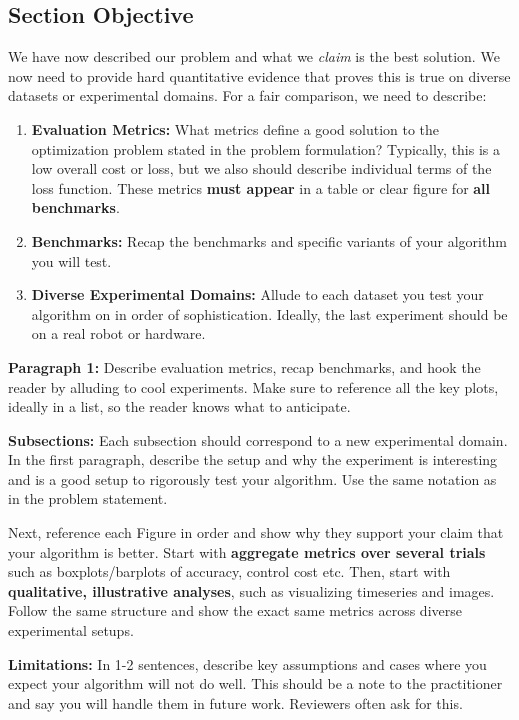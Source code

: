 \subsection{Section Objective}
We have now described our problem and what we \textit{claim} is the best solution.
We now need to provide hard quantitative evidence that proves this is true on diverse datasets or experimental domains. For a fair comparison, we need to describe: 

\begin{enumerate}
    \item \textbf{Evaluation Metrics: } What metrics define a good solution to the optimization problem stated in the problem formulation? Typically, this is a low overall cost or loss, but we also should describe individual terms of the loss function. These metrics \textbf{must appear} in a table or clear figure for \textbf{all benchmarks}. 
    \item \textbf{Benchmarks: } Recap the benchmarks and specific variants of your algorithm you will test. 
    \item \textbf{Diverse Experimental Domains: } Allude to each dataset you test your algorithm on in order of sophistication. Ideally, the last experiment should be on a real robot or hardware.
\end{enumerate}

\textbf{Paragraph 1: }
Describe evaluation metrics, recap benchmarks, and hook the reader by alluding to cool experiments. Make sure to reference all the key plots, ideally in a list, so the reader knows what to anticipate.

\textbf{Subsections: }
Each subsection should correspond to a new experimental domain. In the first paragraph, describe the setup and why the experiment is interesting and is a good setup to rigorously test your algorithm. Use the same notation as in the problem statement. 

Next, reference each Figure in order and show why they support your claim that your algorithm is better. Start with \textbf{aggregate metrics over several trials} such as boxplots/barplots of accuracy, control cost etc. Then, start with \textbf{qualitative, illustrative analyses}, such as visualizing timeseries and images.  Follow
the same structure and show the exact same metrics across diverse experimental setups. 

\textbf{Limitations: }
In 1-2 sentences, describe key assumptions and cases where you expect your algorithm will not do well. This should be a note to the practitioner and say you will handle them in future work. Reviewers often ask for this. 


